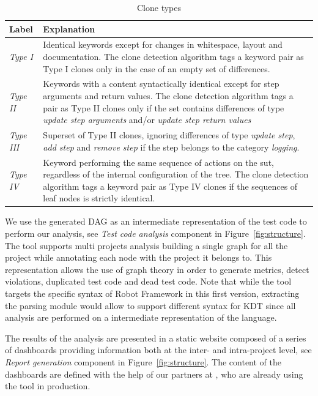 \begin{table}[!t]
\def\arraystretch{1.0}
\caption{Clone types}
\label{table:clones}
\centering
\begin{tabular}{>{\raggedright}m{0.5in}>{\raggedright}m{4.4in}}
\toprule
\textbf{\scriptsize{Label}} & \textbf{\scriptsize{Explanation}}\tabularnewline
\toprule

\scriptsize{\textit{Type I}} & \scriptsize{Identical keywords except for changes in whitespace, layout and documentation. The clone detection algorithm tags a keyword pair as Type I clones only in the case of an empty set of differences.}
\tabularnewline

\scriptsize{\textit{Type II}} & \scriptsize{Keywords with a content syntactically identical except for step arguments and return values. The clone detection algorithm tags a pair as Type II clones only if the set contains differences of type \emph{update step arguments} and/or \emph{update step return values}}
\tabularnewline

\scriptsize{\textit{Type III}} & \scriptsize{Superset of Type II clones, ignoring differences of type  \emph{update step}, \emph{add step} and \emph{remove step} if the step belongs to the category \emph{logging}.}
\tabularnewline

\scriptsize{\textit{Type IV}} & \scriptsize{Keyword performing the same sequence of actions on the \gls{sut}, regardless of the internal configuration of the tree. The clone detection algorithm tags a keyword pair as Type IV clones if the sequences of leaf nodes is strictly identical.}
\tabularnewline

\bottomrule
\end{tabular}
\end{table}
    

We use the generated DAG as an intermediate representation of the test code to perform our analysis, see \emph{Test code analysis} component in Figure~\ref{fig:structure}. The tool supports multi projects analysis building a single graph for all the project while annotating each node with the project it belongs to. This representation allows the use of graph theory in order to generate metrics, detect violations, duplicated test code and dead test code. Note that while the tool targets the specific syntax of Robot Framework in this first version, extracting the parsing module would allow to support different syntax for KDT since all analysis are performed on a intermediate representation of the language.

The results of the analysis are presented in a static website composed of a series of dashboards providing information both at the inter- and intra-project level, see \emph{Report generation} component in Figure~\ref{fig:structure}. The content of the dashboards are defined with the help of our partners at \BGL, who are already using the tool in production.

